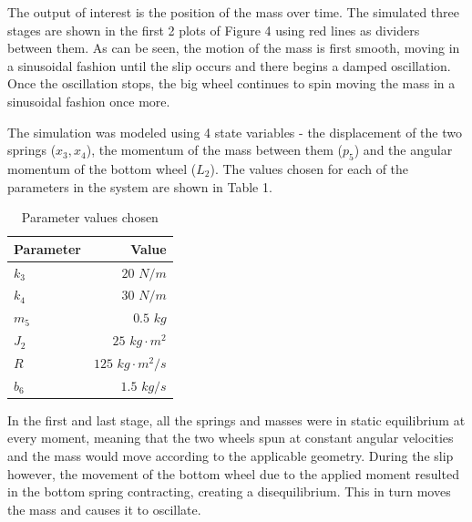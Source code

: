 \documentclass[twoside,twocolumn]{article}
\begin{document}
The output of interest is the position of the mass over time. The simulated three stages are shown in the first 2 plots of Figure 4 using red lines as dividers between them. As can be seen, the motion of the mass is first smooth, moving in a sinusoidal fashion until the slip occurs and there begins a damped oscillation. Once the oscillation stops, the big wheel continues to spin moving the mass in a sinusoidal fashion once more.

The simulation was modeled using 4 state variables - the displacement of the two springs ($x_3, x_4$), the momentum of the mass between them ($p_5$) and the angular momentum of the bottom wheel ($L_2$). The values chosen for each of the parameters in the system are shown in Table 1.

\begin{table}
\caption{Parameter values chosen}
\centering
\begin{tabular}{lr}
\toprule
\cmidrule(r){1-2}
Parameter & Value \\
\midrule
$k_3$ & $20$ $N/m$ \\
$k_4$ & $30$ $N/m$ \\
$m_5$ & $0.5$ $kg$ \\
$J_2$ & $25$ $kg \cdot m^2$ \\
$R$ & $125$ $kg \cdot m^2/s$ \\
$b_6$ & $1.5$ $kg/s$ \\
\bottomrule
\end{tabular}
\end{table}

In the first and last stage, all the springs and masses were in static equilibrium at every moment, meaning that the two wheels spun at constant angular velocities and the mass would move according to the applicable geometry. During the slip however, the movement of the bottom wheel due to the applied moment resulted in the bottom spring contracting, creating a disequilibrium. This in turn moves the mass and causes it to oscillate.


\end{document}
